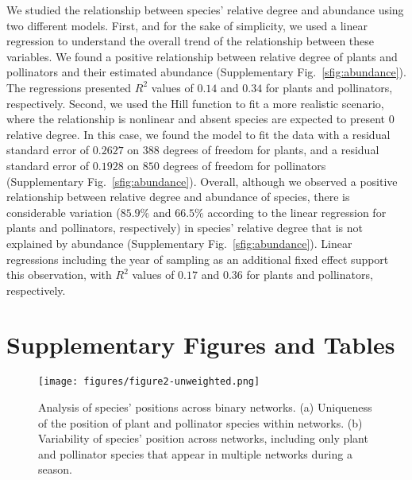 \documentclass[11pt, a4paper]{article}
\begin{document}
We studied the relationship between species' relative degree and abundance using two different models. First, and for the sake of simplicity, we used a linear regression to understand the overall trend of the relationship between these variables. We found a positive relationship between relative degree of plants and pollinators and their estimated abundance (Supplementary Fig.~\ref{sfig:abundance}). The regressions presented $R^2$ values of $0.14$ and $0.34$ for plants and pollinators, respectively. Second, we used the Hill function to fit a more realistic scenario, where the relationship is nonlinear and absent species are expected to present 0 relative degree. In this case, we found the model to fit the data with a residual standard error of $0.2627$ on $388$ degrees of freedom for plants, and a residual standard error of $0.1928$ on $850$ degrees of freedom for pollinators (Supplementary Fig.~\ref{sfig:abundance}). Overall, although we observed a positive relationship between relative degree and abundance of species, there is considerable variation ($85.9\%$ and $66.5\%$ according to the linear regression for plants and pollinators, respectively) in species' relative degree that is not explained by abundance (Supplementary Fig.~\ref{sfig:abundance}). Linear regressions including the year of sampling as an additional fixed effect support this observation, with $R^2$ values of $0.17$ and $0.36$ for plants and pollinators, respectively.

\clearpage

\section*{Supplementary Figures and Tables}

\begin{figure}[ht]
  \centering
    \vspace{0.5cm}
    \texttt{[image: figures/figure2-unweighted.png]}
    	  \vspace{0.3cm}
	   \caption[Analysis of species' positions across binary networks]{Analysis of species' positions across binary networks. (a) Uniqueness of the position of plant and pollinator species within networks. (b) Variability of species' position across networks, including only plant and pollinator species that appear in multiple networks during a season.}
      \label{sfig:variability-positions}
\end{figure}

\clearpage
\end{document}
